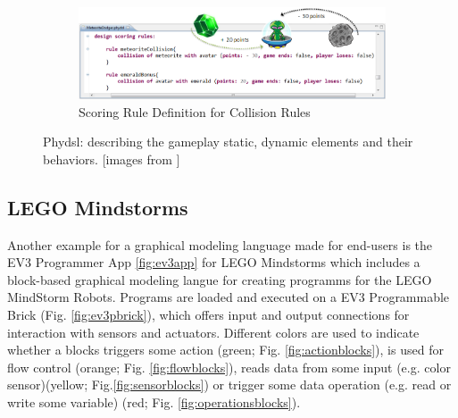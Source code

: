 \documentclass[runningheads,a4paper]{llncs}
\begin{document}
\begin{figure}[H]
\begin{subfigure}[t]{0.45\textwidth}\centering\includegraphics[width=.9\columnwidth]{images/PhyDSL4.PNG}
\caption{Scoring Rule Definition for Collision Rules}\label{rulesdef}\end{subfigure}
\caption{Phydsl:  describing the gameplay static, dynamic elements and their behaviors. [images from  \cite{guana2014phydsl}]}
\end{figure}

   \subsection{LEGO Mindstorms}
   Another example for a graphical modeling language made for end-users is the EV3 Programmer App \ref{fig:ev3app}
   for LEGO Mindstorms which includes a block-based graphical modeling langue for creating programms
   for the LEGO MindStorm Robots. Programs are loaded and executed on a EV3 Programmable Brick (Fig. \ref{fig:ev3pbrick}), 
   which offers input and output connections for interaction with sensors and actuators.
   Different colors are used to indicate whether a blocks triggers some action (green; Fig. \ref{fig:actionblocks}), is used for flow control (orange; Fig. \ref{fig:flowblocks}),
   reads data from some input (e.g. color sensor)(yellow; Fig.\ref{fig:sensorblocks}) or trigger some data operation (e.g. read or write some variable) (red; Fig. \ref{fig:operationsblocks}).
   
\end{document}
